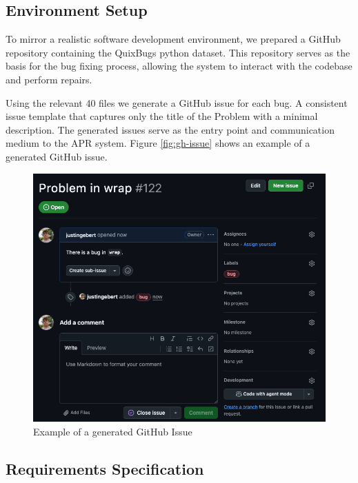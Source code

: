 \subsection{Environment Setup} \label{subsection:environment-setup}
To mirror a realistic software development environment, we prepared a GitHub repository containing the QuixBugs python dataset. This repository serves as the basis for the bug fixing process, allowing the system to interact with the codebase and perform repairs. %

Using the relevant 40 files we generate a GitHub issue for each bug. A consistent issue template that captures only the title of the Problem with a minimal description. The generated issues serve as the entry point and communication medium to the APR system. Figure \ref{fig:gh-issue} shows an example of a generated GitHub issue.

\begin{figure}[H]
    \centering
    \includegraphics[width=1\textwidth]{images/github/github_issue.png}
    \caption{Example of a generated GitHub Issue}
    \label{fig:gh-issue2}
\end{figure}

\subsection{Requirements Specification}

